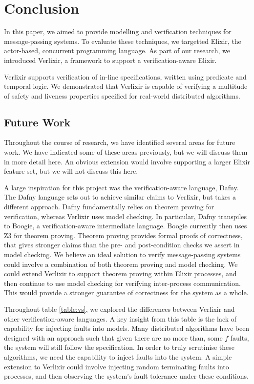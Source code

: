 \chapter{Conclusion}
In this paper, we aimed to provide modelling and verification techniques for message-passing systems. To evaluate these techniques, we targetted Elixir, the actor-based, concurrent programming language. As part of our research, we introduced Verlixir, a framework to support a verification-aware Elixir.
\par
Verlixir supports verification of in-line specifications, written using predicate and temporal logic. We demonstrated that Verlixir is capable of verifying a multitude of safety and liveness properties specified for real-world distributed algorithms. 
\section{Future Work}
Throughout the course of research, we have identified several areas for future work. We have indicated some of these areas previously, but we will discuss them in more detail here. An obvious extension would involve supporting a larger Elixir feature set, but we will not discuss this here.
\par
A large inspiration for this project was the verification-aware language, Dafny. The Dafny language sets out to achieve similar claims to Verlixir, but takes a different approach. Dafny fundamentally relies on theorem proving for verification, whereas Verlixir uses model checking. In particular, Dafny transpiles to Boogie, a verification-aware intermediate language. Boogie currently then uses Z3 for theorem proving. Theorem proving provides formal proofs of correctness, that gives stronger claims than the pre- and post-condition checks we assert in model checking. We believe an ideal solution to verify message-passing systems could involve a combination of both theorem proving and model checking. We could extend Verlixir to support theorem proving within Elixir processes, and then continue to use model checking for verifying inter-process communication. This would provide a stronger guarantee of correctness for the system as a whole.
\par
Throughout table \ref{table:vs}, we explored the differences between Verlixir and other verification-aware languages. A key insight from this table is the lack of capability for injecting faults into models. Many distributed algorithms have been designed with an approach such that given there are no more than, some $f$ faults, the system will still follow the specification. In order to truly scrutinise these algorithms, we need the capability to inject faults into the system. A simple extension to Verlixir could involve injecting random terminating faults into processes, and then observing the system's fault tolerance under these conditions.

